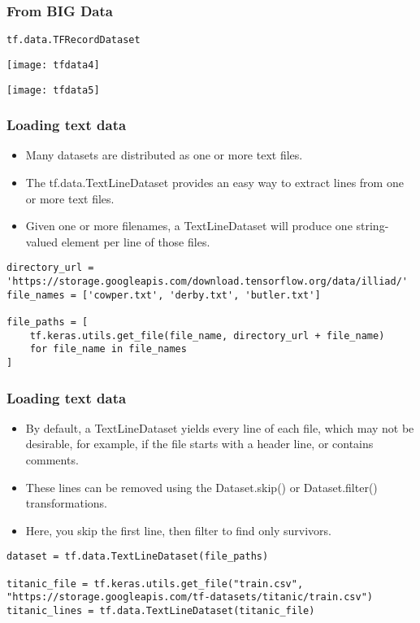 \begin{frame}[fragile]\frametitle{From BIG Data}
\lstinline|tf.data.TFRecordDataset|

\begin{center}

\texttt{[image: tfdata4]}

\texttt{[image: tfdata5]}


\end{center}
\end{frame}

\begin{frame}[fragile]\frametitle{Loading text data}

\begin{itemize}
\item Many datasets are distributed as one or more text files. 
\item The tf.data.TextLineDataset provides an easy way to extract lines from one or more text files. 
\item Given one or more filenames, a TextLineDataset will produce one string-valued element per line of those files.
\end{itemize}


\begin{lstlisting}
directory_url = 'https://storage.googleapis.com/download.tensorflow.org/data/illiad/'
file_names = ['cowper.txt', 'derby.txt', 'butler.txt']

file_paths = [
    tf.keras.utils.get_file(file_name, directory_url + file_name)
    for file_name in file_names
]

\end{lstlisting}
\end{frame}

\begin{frame}[fragile]\frametitle{Loading text data}

\begin{itemize}
\item By default, a TextLineDataset yields every line of each file, which may not be desirable, for example, if the file starts with a header line, or contains comments. \item These lines can be removed using the Dataset.skip() or Dataset.filter() transformations. 
\item Here, you skip the first line, then filter to find only survivors.
\end{itemize}


\begin{lstlisting}
dataset = tf.data.TextLineDataset(file_paths)

titanic_file = tf.keras.utils.get_file("train.csv", "https://storage.googleapis.com/tf-datasets/titanic/train.csv")
titanic_lines = tf.data.TextLineDataset(titanic_file)
\end{lstlisting}
\end{frame}


